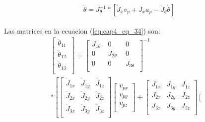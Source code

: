     \vspace{-2.5em}

    \begin{align}
    \begin{split}
          \ddot{ \theta }=J_{ \theta }^{-1}\ast \left[ \dot{J}_{x}v_{p}+J_{x}a_{p}-\dot{J}_{ \theta }\dot{ \theta } \right] 
    \end{split}
    \label{eq:cap4_eq_34}
    \end{align}
    
    
    Las matrices en la ecuacion (\ref{eq:cap4_eq_34}) son: 
        \vspace{-0.5em}
    \begin{multline}
            \left[ \begin{matrix}
        \ddot{ \theta }_{11}~\\
        \ddot{ \theta }_{12}\\
        \ddot{ \theta }_{13}~\\
        \end{matrix}\right] = \left[ \begin{matrix}
        J_{1 \theta }~  &  0  &  0\\
        0  &  J_{2 \theta }~~  &  0\\
        0  &  0  &  J_{3 \theta }~\\
        \end{matrix} \right] ^{-1} \\
    \ast         \left[  \left[ \begin{matrix}
        \dot{J}_{1x}  &  \dot{J}_{1y}  &  \dot{J}_{1z}\\
        \dot{J}_{2x}  &  \dot{J}_{2y}  &  \dot{J}_{2z}\\
        \dot{J}_{3x}  &  \dot{J}_{3y}  &  \dot{J}_{3z}\\
        \end{matrix}\right]   \left[ \begin{matrix}
        v_{px}\\
        v_{py}\\
        v_{pz}\\
        \end{matrix}\right]+\left[ \begin{matrix}
        J_{1x}  &  J_{1y}  &  J_{1z}\\
        J_{2x}  &  J_{2y}  &  J_{2z}\\
        J_{3x}  &  J_{3y}  &  J_{3z}\\
        \end{matrix} \right] \left[ \begin{matrix}

\end{matrix}
\end{multline}
